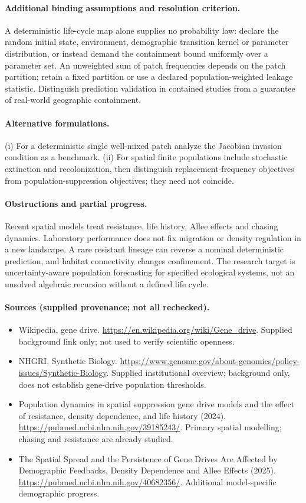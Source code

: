 \documentclass[11pt]{article}
\begin{document}
\paragraph{Additional binding assumptions and resolution criterion.} A deterministic life-cycle map alone supplies no probability law: declare the random initial state, environment, demographic transition kernel or parameter distribution, or instead demand the containment bound uniformly over a parameter set. An unweighted sum of patch frequencies depends on the patch partition; retain a fixed partition or use a declared population-weighted leakage statistic. Distinguish prediction validation in contained studies from a guarantee of real-world geographic containment.

\paragraph{Alternative formulations.} (i) For a deterministic single well-mixed patch analyze the Jacobian invasion condition as a benchmark. (ii) For spatial finite populations include stochastic extinction and recolonization, then distinguish replacement-frequency objectives from population-suppression objectives; they need not coincide.
\paragraph{Obstructions and partial progress.} Recent spatial models treat resistance, life history, Allee effects and chasing dynamics. Laboratory performance does not fix migration or density regulation in a new landscape. A rare resistant lineage can reverse a nominal deterministic prediction, and habitat connectivity changes confinement. The research target is uncertainty-aware population forecasting for specified ecological systems, not an unsolved algebraic recursion without a defined life cycle.
\paragraph{Sources (supplied provenance; not all rechecked).}
\begin{itemize}
\item Wikipedia, gene drive. \url{https://en.wikipedia.org/wiki/Gene_drive}. Supplied background link only; not used to verify scientific openness.
\item NHGRI, Synthetic Biology. \url{https://www.genome.gov/about-genomics/policy-issues/Synthetic-Biology}. Supplied institutional overview; background only, does not establish gene-drive population thresholds.
\item Population dynamics in spatial suppression gene drive models and the effect of resistance, density dependence, and life history (2024). \url{https://pubmed.ncbi.nlm.nih.gov/39185243/}. Primary spatial modelling; chasing and resistance are already studied.
\item The Spatial Spread and the Persistence of Gene Drives Are Affected by Demographic Feedbacks, Density Dependence and Allee Effects (2025). \url{https://pubmed.ncbi.nlm.nih.gov/40682356/}. Additional model-specific demographic progress.
\end{itemize}
\end{document}

